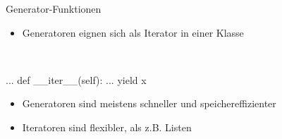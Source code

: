 \documentclass[ngerman]{beamer}
\theoremstyle{definition}
\begin{document}
\begin{frame}{Generator-Funktionen}
\begin{itemize}
	\item Generatoren eignen sich als Iterator in einer Klasse  
\end{itemize}
	\begin{exampleblock}~
	\begin{python}[numbers=none]
...
def __iter__(self):
	...
	yield x
	\end{python}
	\end{exampleblock}
\begin{itemize}
	\item Generatoren sind meistens schneller und speichereffizienter
	\item Iteratoren sind flexibler, als z.B. Listen
\end{itemize}
\end{frame}
\end{document}
